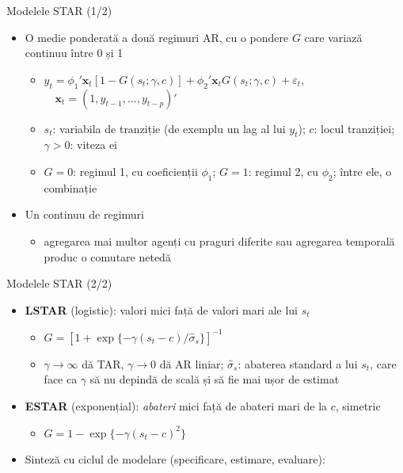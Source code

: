 \begin{frame}{Modelele STAR (1/2)}
\itemsize{\small}
\begin{itemize}
    \item O medie ponderată a două regimuri AR, cu o pondere $G$ care variază continuu între 0 și 1 
    \begin{itemize}
        \item $y_t = \phi_1'\mathbf x_t[1 - G(s_t; \gamma, c)] + \phi_2'\mathbf x_t G(s_t; \gamma, c) + \varepsilon_t$, $\quad \mathbf x_t = (1, y_{t-1}, \dots, y_{t-p})'$
        \item $s_t$: variabila de tranziție (de exemplu un lag al lui $y_t$); $c$: locul tranziției; $\gamma > 0$: viteza ei
        \item $G = 0$: regimul 1, cu coeficienții $\phi_1$; $G = 1$: regimul 2, cu $\phi_2$; între ele, o combinație
    \end{itemize}
    \item Un continuu de regimuri
    \begin{itemize}
        \item agregarea mai multor agenți cu praguri diferite sau agregarea temporală produc o comutare netedă
    \end{itemize}
\end{itemize}
\end{frame}

\begin{frame}{Modelele STAR (2/2)}
\itemsize{\small}
\begin{itemize}
    \item \textbf{LSTAR} (logistic): valori mici față de valori mari ale lui $s_t$
    \begin{itemize}
        \item $G = [1 + \exp\{-\gamma(s_t - c)/\hat\sigma_s\}]^{-1}$
        \item $\gamma \to \infty$ dă TAR, $\gamma \to 0$ dă AR liniar; $\hat\sigma_s$: abaterea standard a lui $s_t$, care face ca $\gamma$ să nu depindă de scală și să fie mai ușor de estimat
    \end{itemize}
    \item \textbf{ESTAR} (exponențial): \emph{abateri} mici față de abateri mari de la $c$, simetric
    \begin{itemize}
        \item $G = 1 - \exp\{-\gamma(s_t - c)^2\}$
    \end{itemize}
    \item Sinteză cu ciclul de modelare (specificare, estimare, evaluare): 
\end{itemize}
\end{frame}

